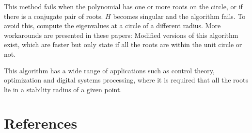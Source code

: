 \documentclass[twofold]{article}
\theoremstyle{plain}
\theoremstyle{definition}
\theoremstyle{remark}
\begin{document}
This method fails when the polynomial has one or more roots on the circle, or if there is a conjugate pair of roots. \(H\) becomes singular and the algorithm fails.  To avoid this, compute the eigenvalues at a circle of a different radius. More workarounds are presented in these papers: Modified versions of this algorithm exist, which are faster but only state if all the roots are within the unit circle or not. 

This algorithm has a wide range of applications such as control theory, optimization and digital systems processing, where it is required that all the roots lie in a stability radius of a given point.
\section*{References}
\end{document}
